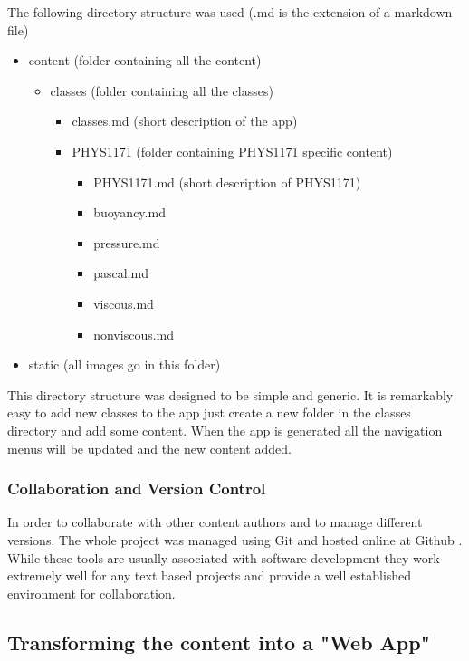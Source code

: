 \documentclass[12pt,a4paper]{article}  %
\begin{document}
The following directory structure was used (.md is the extension of a markdown file)
\begin{itemize}
\item content (folder containing all the content)
\begin{itemize}
\item classes (folder containing all the classes)
\begin{itemize}
\item classes.md (short description of the app)
\item PHYS1171 (folder containing PHYS1171 specific content)
\begin{itemize}
\item PHYS1171.md (short description of PHYS1171)
\item buoyancy.md
\item pressure.md
\item pascal.md
\item viscous.md
\item nonviscous.md
\end{itemize}
\end{itemize}
\end{itemize}
\item static (all images go in this folder)
\end{itemize}

This directory structure was designed to be simple and generic. It is remarkably easy to add new classes to the app just create a new folder in the classes directory and add some content. When the app is generated all the navigation menus will be updated and the new content added.

\subsubsection{Collaboration and Version Control}

In order to collaborate with other content authors and to manage different versions. The whole project was managed using Git \cite{git} and hosted online at Github \cite{github}. While these tools are usually associated with software development they work extremely well for any text based projects and provide a well established environment for collaboration. 

\subsection{Transforming the content into a "Web App"}
\end{document}
